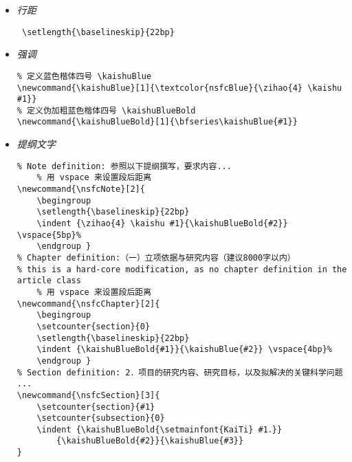 \documentclass[a4paper]{article}
\begin{document}
{\begin{itemize}
\begin{verbatim}
% 设置正文小四号字体
\newcommand{\xiaosihao}{\fontsize{12pt}{\baselineskip}\selectfont} 
% 为楷体启用伪粗体 autofakebold 并定义为 \kaishu
\let\kaishu\relax
\newCJKfontfamily\kaishu{KaiTi}[AutoFakeBold] 
\end{verbatim}
    \item \emph{行距 } \begin{verbatim} \setlength{\baselineskip}{22bp} \end{verbatim}
    \item \emph{强调 } \begin{verbatim}
% 定义蓝色楷体四号 \kaishuBlue
\newcommand{\kaishuBlue}[1]{\textcolor{nsfcBlue}{\zihao{4} \kaishu #1}}
% 定义伪加粗蓝色楷体四号 \kaishuBlueBold
\newcommand{\kaishuBlueBold}[1]{\bfseries\kaishuBlue{#1}}
\end{verbatim}
    \item \emph{提纲文字 } \begin{verbatim}
% Note definition: 参照以下提纲撰写，要求内容...
    % 用 vspace 来设置段后距离
\newcommand{\nsfcNote}[2]{   
    \begingroup
    \setlength{\baselineskip}{22bp}
    \indent {\zihao{4} \kaishu #1}{\kaishuBlueBold{#2}} \vspace{5bp}%
    \endgroup }
% Chapter definition:（一）立项依据与研究内容（建议8000字以内）
% this is a hard-core modification, as no chapter definition in the article class
    % 用 vspace 来设置段后距离
\newcommand{\nsfcChapter}[2]{   
    \begingroup
    \setcounter{section}{0}  
    \setlength{\baselineskip}{22bp}
    \indent {\kaishuBlueBold{#1}}{\kaishuBlue{#2}} \vspace{4bp}%
    \endgroup }
% Section definition: 2．项目的研究内容、研究目标，以及拟解决的关键科学问题 ...
\newcommand{\nsfcSection}[3]{   
    \setcounter{section}{#1}
    \setcounter{subsection}{0}
    \indent {\kaishuBlueBold{\setmainfont{KaiTi} #1．}}
        {\kaishuBlueBold{#2}}{\kaishuBlue{#3}} 
}
\end{verbatim}

\end{itemize}  

}
\end{document}
